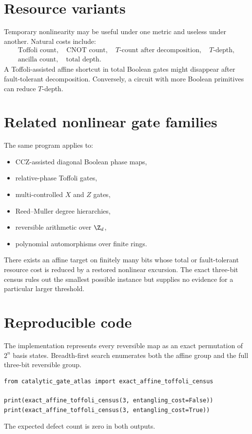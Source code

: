 \section{Resource variants}
Temporary nonlinearity may be useful under one metric and useless under another.  Natural costs include:
\[
\begin{gathered}
\text{Toffoli count},\quad \text{CNOT count},\quad
T\text{-count after decomposition},\quad T\text{-depth},\\
\text{ancilla count},\quad \text{total depth}.
\end{gathered}
\]
A Toffoli-assisted affine shortcut in total Boolean gates might disappear after fault-tolerant decomposition.  Conversely, a circuit with more Boolean primitives can reduce $T$-depth.

\section{Related nonlinear gate families}
The same program applies to:
\begin{itemize}
\item CCZ-assisted diagonal Boolean phase maps,
\item relative-phase Toffoli gates,
\item multi-controlled $X$ and $Z$ gates,
\item Reed--Muller degree hierarchies,
\item reversible arithmetic over $\Z_d$,
\item polynomial automorphisms over finite rings.
\end{itemize}

\begin{conjecturebox}
There exists an affine target on finitely many bits whose total or fault-tolerant resource cost is reduced by a restored nonlinear excursion.  The exact three-bit census rules out the smallest possible instance but supplies no evidence for a particular larger threshold.
\end{conjecturebox}

\section{Reproducible code}
The implementation represents every reversible map as an exact permutation of $2^n$ basis states.  Breadth-first search enumerates both the affine group and the full three-bit reversible group.

\begin{lstlisting}[style=pythonstyle,caption={Exact three-bit affine-versus-Toffoli census.}]
from catalytic_gate_atlas import exact_affine_toffoli_census

print(exact_affine_toffoli_census(3, entangling_cost=False))
print(exact_affine_toffoli_census(3, entangling_cost=True))
\end{lstlisting}
The expected defect count is zero in both outputs.
